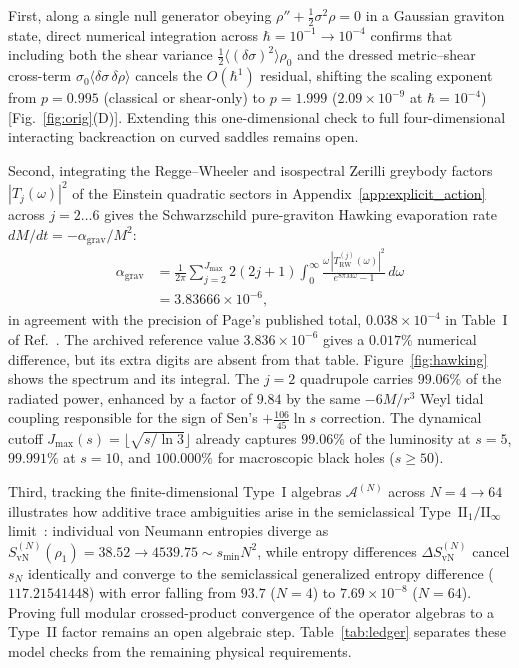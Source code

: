 \documentclass[onecolumn,11pt,aps,prd,amsmath,amssymb,nofootinbib,floatfix]{revtex4-2}
\newcommand{\calA}{\mathcal{A}}
\begin{document}
First, along a single null generator obeying $\rho''+\frac{1}{2}\sigma^2\rho=0$ in a Gaussian graviton state, direct numerical integration across $\hbar=10^{-1}\to 10^{-4}$ confirms that including both the shear variance $\frac{1}{2}\langle(\delta\sigma)^2\rangle\rho_0$ and the dressed metric--shear cross-term $\sigma_0\langle\delta\sigma\,\delta\rho\rangle$ cancels the $O(\hbar^1)$ residual, shifting the scaling exponent from $p=0.995$ (classical or shear-only) to $p=1.999$ ($2.09\times 10^{-9}$ at $\hbar=10^{-4}$) [Fig.~\ref{fig:orig}(D)]. Extending this one-dimensional check to full four-dimensional interacting backreaction on curved saddles remains open.

Second, integrating the Regge--Wheeler and isospectral Zerilli greybody factors $|T_j(\omega)|^2$ of the Einstein quadratic sectors in Appendix~\ref{app:explicit_action} across $j=2\dots 6$ gives the Schwarzschild pure-graviton Hawking evaporation rate $dM/dt=-\alpha_{\mathrm{grav}}/M^2$:
\begin{align}\label{eq:page_power}
\alpha_{\mathrm{grav}} &= \frac{1}{2\pi}\sum_{j=2}^{J_{\max}} 2(2j+1)\int_0^\infty \frac{\omega\,|T_{\mathrm{RW}}^{(j)}(\omega)|^2}{e^{8\pi M\omega}-1}\,d\omega \nonumber\\
&= 3.83666\times 10^{-6},
\end{align}
in agreement with the precision of Page's published total, $0.038\times10^{-4}$ in Table~I of Ref.~\cite{Page1976}. The archived reference value $3.836\times10^{-6}$ gives a $0.017\%$ numerical difference, but its extra digits are absent from that table. Figure~\ref{fig:hawking} shows the spectrum and its integral. The $j=2$ quadrupole carries $99.06\%$ of the radiated power, enhanced by a factor of $9.84$ by the same $-6M/r^3$ Weyl tidal coupling responsible for the sign of Sen's $+\frac{106}{45}\ln s$ correction. The dynamical cutoff $J_{\max}(s)=\lfloor\sqrt{s/\ln 3}\rfloor$ already captures $99.06\%$ of the luminosity at $s=5$, $99.991\%$ at $s=10$, and $100.000\%$ for macroscopic black holes ($s\ge 50$).

Third, tracking the finite-dimensional Type~I algebras $\calA^{(N)}$ across $N=4\to 64$ illustrates how additive trace ambiguities arise in the semiclassical Type~$\mathrm{II}_1/\mathrm{II}_\infty$ limit~\cite{CLPW2023,CPW2023}: individual von Neumann entropies diverge as $S_{\mathrm{vN}}^{(N)}(\rho_1)=38.52\to 4539.75\sim s_{\min}N^2$, while entropy differences $\Delta S_{\mathrm{vN}}^{(N)}$ cancel $s_N$ identically and converge to the semiclassical generalized entropy difference ($117.21541448$) with error falling from $93.7$ ($N=4$) to $7.69\times 10^{-8}$ ($N=64$). Proving full modular crossed-product convergence of the operator algebras to a Type~II factor remains an open algebraic step. Table~\ref{tab:ledger} separates these model checks from the remaining physical requirements.
\end{document}
